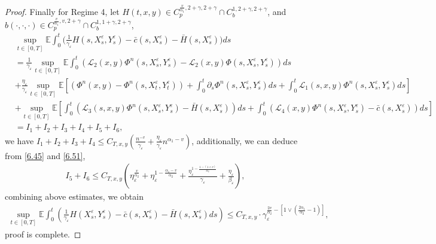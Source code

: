 \documentclass[11pt,reqno]{amsart}
\numberwithin{equation}{section}
\begin{document}
\begin{proof}
Finally for Regime 4, let  $H(t,x,y)\in C_{p}^{\frac{v}{\alpha_{1}},2+\gamma,2+\gamma}\cap C_{b}^{1,2+\gamma,2+\gamma}$, and $b(\cdot,\cdot,\cdot)\in C_{p}^{\frac{v}{\alpha_{1}},v,2+\gamma}\cap C_{b}^{1,1+\gamma,2+\gamma}$,
\begin{align*}
		&	\sup_{t\in [0,T]}\mathbb{E}\int_{0}^{t}\Big(\frac{1}{\gamma_{\varepsilon}} H(s,X_{s}^{\varepsilon},Y_{s}^{\varepsilon})- \bar{c}(s,X_{s}^{\varepsilon})- \bar{H}(s,X_{s}^{\varepsilon})\Big)ds\\
		&=\frac{1}{\gamma_{\varepsilon}}	\sup_{t\in [0,T]}\mathbb{E}\int_{0}^{t}\left( \mathcal{L}_{2}(x,y)\Phi^{n}(s,X_{s}^{\varepsilon},Y_{s}^{\varepsilon})-\mathcal{L}_{2}(x,y)\Phi(s,X_{s}^{\varepsilon},Y_{s}^{\varepsilon})\right) ds\\
		&+\frac{\eta_{\varepsilon}}{{\gamma_{\varepsilon}}}	\sup_{t\in [0,T]}\mathbb{E}\left[ (\Phi^{n}(x,y)-\Phi^{n}(s,X_{t}^{\varepsilon},Y_{t}^{\varepsilon}))+\int_{0}^{t}\partial_{s}\Phi^{n}(s,X_{s}^{\varepsilon},Y_{s}^{\varepsilon})ds+\int_{0}^{t}\mathcal{L}_{1}(s,x,y)\Phi^{n}(s,X_{s}^{\varepsilon},Y_{s}^{\varepsilon})ds\right]\\
		& +\sup_{t\in [0,T]}\mathbb{E}\left[ \int_{0}^{t}(\mathcal{L}_{3}(s,x,y)\Phi^{n}(s,X_{s}^{\varepsilon},Y_{s}^{\varepsilon})- \bar{H}(s,X_{s}^{\varepsilon}))ds+\int_{0}^{t}(\mathcal{L}_{4}(x,y)\Phi^{n}(s,X_{s}^{\varepsilon},Y_{s}^{\varepsilon})-\bar{c}(s,X_{s}^{\varepsilon}))ds\right]  \\
		&=I_{1}+I_{2}+I_{3}+I_{4}+I_{5}+I_{6},
\end{align*}
 we have $
		I_{1}+I_{2}+I_{3}+I_{4}\leq C_{T,x,y}(\frac{n^{-v}}{\gamma_{\varepsilon}}+\frac{\eta_{\varepsilon}}{\gamma_{\varepsilon}}n^{\alpha_{1}-v})
$, additionally, we can deduce from \eqref{6.45} and \eqref{6.51}, 
\begin{align*}
I_{5}+I_{6}\leq C_{T,x,y}\left(  \eta_{\varepsilon}^{\frac{v}{\alpha_{2}}}+\eta_{\varepsilon}^{1-\frac{\alpha_{1}-v}{\alpha_{2}}}+\frac{\eta_{\varepsilon}^{1-\frac{1-(1\wedge v)}{\alpha_{2}}}}{\gamma_{\varepsilon}}+\frac{\eta_{\varepsilon}}{\beta_{\varepsilon}}\right),
\end{align*}
combining above estimates, we obtain
\begin{equation}\label{6.55}
	\begin{split}
		 \sup_{t\in [0,T]}\mathbb{E} \int_{0}^{t}\left(  \frac{1}{\gamma_{\varepsilon}}H(X_{s}^{\varepsilon},Y_{s}^{\varepsilon})- \bar{c}(s,X_{s}^{\varepsilon})- \bar{H}(s,X_{s}^{\varepsilon}) ds \right) \leq C_{T,x,y}\cdot \gamma_{\varepsilon}^{\frac{2v}{\alpha_{2}}-\left[ 1\vee \left( \frac{2\alpha_{1}}{\alpha_{2}}-1\right)   \right] },
	\end{split}\nonumber
\end{equation}
proof is complete.
\end{proof}
\end{document}
